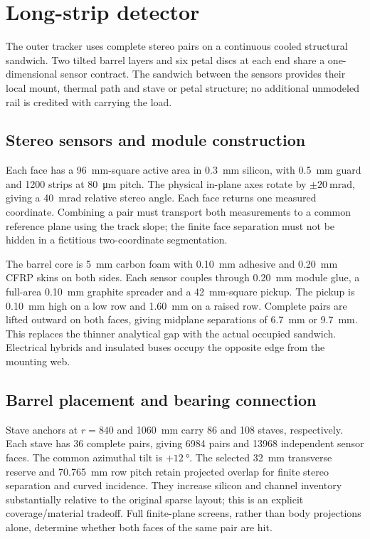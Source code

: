 \section{Long-strip detector}
\label{sec:long-strips}
The outer tracker uses complete stereo pairs on a continuous cooled structural
sandwich. Two tilted barrel layers and six petal discs at each end share a
one-dimensional sensor contract. The sandwich between the sensors provides
their local mount, thermal path and stave or petal structure; no additional
unmodeled rail is credited with carrying the load.

\subsection{Stereo sensors and module construction}
Each face has a \qty{96}{\milli\metre}-square active area in
\qty{0.3}{\milli\metre} silicon, with \qty{0.5}{\milli\metre} guard and
1200 strips at \qty{80}{\micro\metre} pitch. The physical in-plane axes rotate
by $\pm\qty{20}{\milli\radian}$, giving a \qty{40}{\milli\radian} relative
stereo angle. Each face returns one measured coordinate. Combining a pair must
transport both measurements to a common reference plane using the track slope;
the finite face separation must not be hidden in a fictitious two-coordinate
segmentation.

The barrel core is \qty{5}{\milli\metre} carbon foam with
\qty{0.10}{\milli\metre} adhesive and \qty{0.20}{\milli\metre} CFRP skins on
both sides. Each sensor couples through \qty{0.20}{\milli\metre} module glue,
a full-area \qty{0.10}{\milli\metre} graphite spreader and a
\qty{42}{\milli\metre}-square pickup. The pickup is
\qty{0.10}{\milli\metre} high on a low row and
\qty{1.60}{\milli\metre} on a raised row. Complete pairs are lifted outward
on both faces, giving midplane separations of \qty{6.7}{\milli\metre} or
\qty{9.7}{\milli\metre}. This replaces the thinner analytical gap with the
actual occupied sandwich. Electrical hybrids and insulated buses occupy the
opposite edge from the mounting web.

\subsection{Barrel placement and bearing connection}
Stave anchors at $r=840$ and \qty{1060}{\milli\metre} carry 86 and 108 staves,
respectively. Each stave has 36 complete pairs, giving \num{6984} pairs and
\num{13968} independent sensor faces. The common azimuthal tilt is
$+\qty{12}{\degree}$. The selected \qty{32}{\milli\metre} transverse reserve
and \qty{70.765}{\milli\metre} row pitch retain projected overlap for finite
stereo separation and curved incidence. They increase silicon and channel
inventory substantially relative to the original sparse layout; this is an
explicit coverage/material tradeoff. Full finite-plane screens, rather than
body projections alone, determine whether both faces of the same pair are hit.

